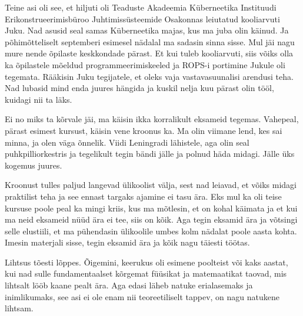 Teine asi oli see, et  hiljuti oli Teaduste Akadeemia Küberneetika Instituudi 
Erikonstrueerimisbüroo Juhtimissüsteemide Osakonnas 
leiutatud kooliarvuti Juku. Nad asusid seal 
samas Küberneetika majas, kus ma juba olin käinud. Ja põhimõtteliselt 
septemberi esimesel nädalal ma sadasin sinna sisse. Mul jäi nagu mure nende 
õpilaste keskkondade pärast. Et kui tuleb kooliarvuti, siis võiks olla ka  
õpilastele mõeldud programmeerimiskeeled ja ROPS-i portimine 
Jukule oli tegemata. Rääkisin Juku tegijatele, et oleks vaja  vastavasuunalisi 
arendusi teha. Nad lubasid mind enda juures hängida ja kuskil nelja kuu pärast 
olin tööl, kuidagi nii ta läks. 


Ei no miks ta kõrvale jäi, ma käisin ikka korralikult eksameid tegemas. 
Vahepeal, pärast esimest kursust, käisin vene kroonus ka.  Ma olin viimane 
lend, kes sai minna, ja olen väga õnnelik. Viidi Leningradi lähistele, aga olin 
seal puhkpilliorkestris ja tegelikult tegin bändi jälle ja polnud häda midagi. 
Jälle üks kogemus juures. 

Kroonust tulles paljud langevad ülikoolist välja, sest nad leiavad, et võiks 
midagi praktilist teha ja see ennast targaks ajamine ei tasu ära. Eks mul ka 
oli teise kursuse poole peal ka mingi kriis, kus ma mõtlesin, et on kohal 
käimata ja et kui ma neid eksameid nüüd ära ei tee, siis on kõik. Aga tegin 
eksamid ära ja  võtsingi selle elustiili, et ma pühendasin ülikoolile umbes 
kolm nädalat poole aasta kohta. Imesin materjali sisse, tegin eksamid ära ja 
kõik nagu täiesti töötas. 


Lihtsus tõesti lõppes. Õigemini, keerukus oli esimene poolteist või kaks  
aastat,  kui nad sulle fundamentaalset kõrgemat füüsikat ja matemaatikat 
taovad, mis lihtsalt lööb kaane pealt ära. Aga edasi läheb natuke erialasemaks 
ja inimlikumaks, see asi ei ole enam nii teoreetiliselt tappev, on nagu 
natukene lihtsam. 

